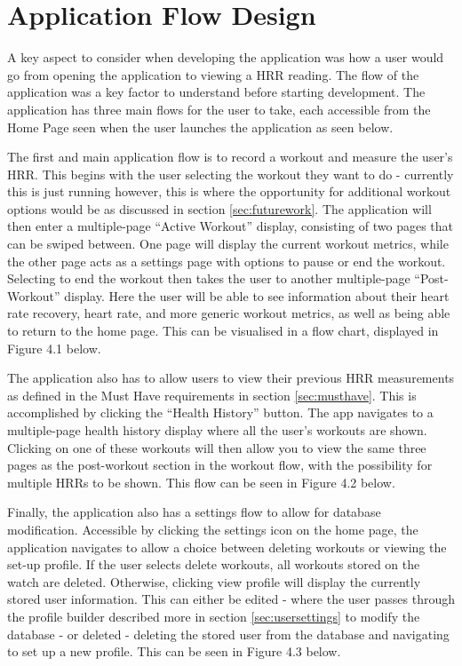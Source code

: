 \documentclass{l4proj}
\begin{document}
\section{Application Flow Design}
\label{sec:appflow}

A key aspect to consider when developing the application was how a user would go from opening the application to viewing a HRR reading. The flow of the application was a key factor to understand before starting development. The application has three main flows for the user to take, each accessible from the Home Page seen when the user launches the application as seen below.

The first and main application flow is to record a workout and measure the user’s HRR. This begins with the user selecting the workout they want to do - currently this is just running however, this is where the opportunity for additional workout options would be as discussed in section \ref{sec:futurework}. The application will then enter a multiple-page “Active Workout” display, consisting of two pages that can be swiped between. One page will display the current workout metrics, while the other page acts as a settings page with options to pause or end the workout. Selecting to end the workout then takes the user to another multiple-page “Post-Workout” display. Here the user will be able to see information about their heart rate recovery, heart rate, and more generic workout metrics, as well as being able to return to the home page. This can be visualised in a flow chart, displayed in Figure 4.1 below.



The application also has to allow users to view their previous HRR measurements as defined in the Must Have requirements in section \ref{sec:musthave}. This is accomplished by clicking the “Health History” button. The app navigates to a multiple-page health history display where all the user’s workouts are shown. Clicking on one of these workouts will then allow you to view the same three pages as the post-workout section in the workout flow, with the possibility for multiple HRRs to be shown. This flow can be seen in Figure 4.2 below.



Finally, the application also has a settings flow to allow for database modification. Accessible by clicking the settings icon on the home page, the application navigates to allow a choice between deleting workouts or viewing the set-up profile. If the user selects delete workouts, all workouts stored on the watch are deleted. Otherwise, clicking view profile will display the currently stored user information. This can either be edited - where the user passes through the profile builder described more in section \ref{sec:usersettings} to modify the database - or deleted - deleting the stored user from the database and navigating to set up a new profile. This can be seen in Figure 4.3 below.
\end{document}
